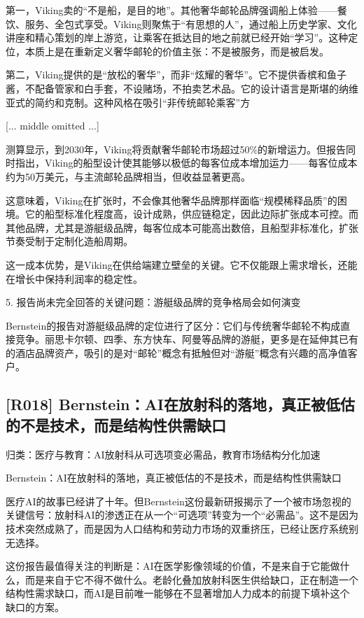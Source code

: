 \documentclass[11pt]{ctexart}
\begin{document}
第一，Viking卖的“不是船，是目的地”。其他奢华邮轮品牌强调船上体验——餐饮、服务、全包式享受。Viking则聚焦于“有思想的人”，通过船上历史学家、文化讲座和精心策划的岸上游览，让乘客在抵达目的地之前就已经开始“学习”。这种定位，本质上是在重新定义奢华邮轮的价值主张：不是被服务，而是被启发。

第二，Viking提供的是“放松的奢华”，而非“炫耀的奢华”。它不提供香槟和鱼子酱，不配备管家和白手套，不设赌场，不拍卖艺术品。它的设计语言是斯堪的纳维亚式的简约和克制。这种风格在吸引“非传统邮轮乘客”方

[... middle omitted ...]

测算显示，到2030年，Viking将贡献奢华邮轮市场超过50\%的新增运力。但报告同时指出，Viking的船型设计使其能够以极低的每客位成本增加运力——每客位成本约为50万美元，与主流邮轮品牌相当，但收益显著更高。

这意味着，Viking在扩张时，不会像其他奢华品牌那样面临“规模稀释品质”的困境。它的船型标准化程度高，设计成熟，供应链稳定，因此边际扩张成本可控。而其他品牌，尤其是游艇级品牌，每客位成本可能高出数倍，且船型非标准化，扩张节奏受制于定制化造船周期。

这一成本优势，是Viking在供给端建立壁垒的关键。它不仅能跟上需求增长，还能在增长中保持利润率的稳定性。

5. 报告尚未完全回答的关键问题：游艇级品牌的竞争格局会如何演变

Bernstein的报告对游艇级品牌的定位进行了区分：它们与传统奢华邮轮不构成直接竞争。丽思卡尔顿、四季、东方快车、阿曼等品牌的游艇，更多是在延伸其已有的酒店品牌资产，吸引的是对“邮轮”概念有抵触但对“游艇”概念有兴趣的高净值客户。

\subsection{[R018] Bernstein：AI在放射科的落地，真正被低估的不是技术，而是结构性供需缺口}
{\small\color{refgray}归类：医疗与教育：AI放射科从可选项变必需品，教育市场结构分化加速}

Bernstein：AI在放射科的落地，真正被低估的不是技术，而是结构性供需缺口

医疗AI的故事已经讲了十年。但Bernstein这份最新研报揭示了一个被市场忽视的关键信号：放射科AI的渗透正在从一个“可选项”转变为一个“必需品”。这不是因为技术突然成熟了，而是因为人口结构和劳动力市场的双重挤压，已经让医疗系统别无选择。

这份报告最值得关注的判断是：AI在医学影像领域的价值，不是来自于它能做什么，而是来自于它不得不做什么。老龄化叠加放射科医生供给缺口，正在制造一个结构性需求缺口，而AI是目前唯一能够在不显著增加人力成本的前提下填补这个缺口的方案。
\end{document}
